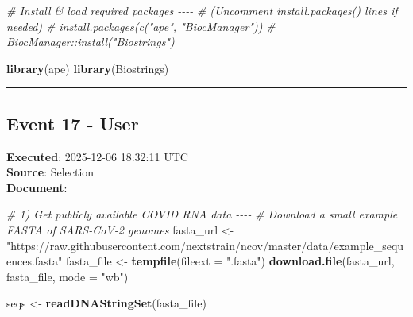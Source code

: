 \documentclass[
  11pt,
]{article}
\newenvironment{Shaded}{\begin{snugshade}}{\end{snugshade}}
\newcommand{\AttributeTok}[1]{\textcolor[rgb]{0.13,0.29,0.53}{#1}}
\newcommand{\CommentTok}[1]{\textcolor[rgb]{0.56,0.35,0.01}{\textit{#1}}}
\newcommand{\FunctionTok}[1]{\textcolor[rgb]{0.13,0.29,0.53}{\textbf{#1}}}
\newcommand{\NormalTok}[1]{#1}
\newcommand{\OtherTok}[1]{\textcolor[rgb]{0.56,0.35,0.01}{#1}}
\newcommand{\StringTok}[1]{\textcolor[rgb]{0.31,0.60,0.02}{#1}}
\begin{document}
\begin{Shaded}
\begin{Highlighting}[]
\CommentTok{\# Install \& load required packages {-}{-}{-}{-}}
\CommentTok{\# (Uncomment install.packages() lines if needed)}
\CommentTok{\# install.packages(c("ape", "BiocManager"))}
\CommentTok{\# BiocManager::install("Biostrings")}

\FunctionTok{library}\NormalTok{(ape)}
\FunctionTok{library}\NormalTok{(Biostrings)}
\end{Highlighting}
\end{Shaded}

\begin{center}\rule{0.5\linewidth}{0.5pt}\end{center}

\subsection{Event 17 - User}\label{event-17---user}

\textbf{Executed}: 2025-12-06 18:32:11 UTC\\
\textbf{Source}: Selection\\
\textbf{Document}:

\begin{Shaded}
\begin{Highlighting}[]
\CommentTok{\# 1) Get publicly available COVID RNA data {-}{-}{-}{-}}
\CommentTok{\# Download a small example FASTA of SARS{-}CoV{-}2 genomes}
\NormalTok{fasta\_url }\OtherTok{\textless{}{-}} \StringTok{"https://raw.githubusercontent.com/nextstrain/ncov/master/data/example\_sequences.fasta"}
\NormalTok{fasta\_file }\OtherTok{\textless{}{-}} \FunctionTok{tempfile}\NormalTok{(}\AttributeTok{fileext =} \StringTok{".fasta"}\NormalTok{)}
\FunctionTok{download.file}\NormalTok{(fasta\_url, fasta\_file, }\AttributeTok{mode =} \StringTok{"wb"}\NormalTok{)}

\NormalTok{seqs }\OtherTok{\textless{}{-}} \FunctionTok{readDNAStringSet}\NormalTok{(fasta\_file)}
\end{Highlighting}
\end{Shaded}
\end{document}
